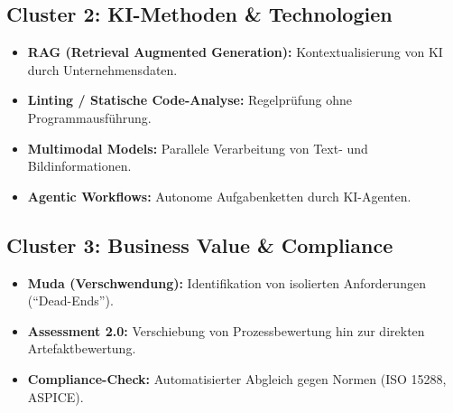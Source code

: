 \documentclass[a4paper,11pt]{article}
\begin{document}
\subsection*{Cluster 2: KI-Methoden \& Technologien}
\begin{itemize}[label=$\bullet$, nosep]
    \item \textbf{RAG (Retrieval Augmented Generation):} Kontextualisierung von KI durch Unternehmensdaten.
    \item \textbf{Linting / Statische Code-Analyse:} Regelprüfung ohne Programmausführung.
    \item \textbf{Multimodal Models:} Parallele Verarbeitung von Text- und Bildinformationen.
    \item \textbf{Agentic Workflows:} Autonome Aufgabenketten durch KI-Agenten.
\end{itemize}

\subsection*{Cluster 3: Business Value \& Compliance}
\begin{itemize}[label=$\bullet$, nosep]
    \item \textbf{Muda (Verschwendung):} Identifikation von isolierten Anforderungen (\enquote{Dead-Ends}).
    \item \textbf{Assessment 2.0:} Verschiebung von Prozessbewertung hin zur direkten Artefaktbewertung.
    \item \textbf{Compliance-Check:} Automatisierter Abgleich gegen Normen (ISO 15288, ASPICE).
\end{itemize}

\vspace{1cm}
\end{document}
